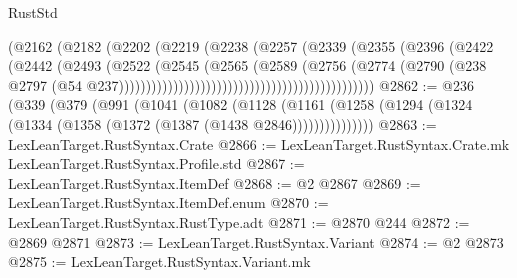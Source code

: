 \begin{lexlean}{RustStd}
\begin{coremodule}
{{{{{{{{{{{{{{{{{{{                                                        (@2162
                                                          (@2182
                                                            (@2202
                                                              (@2219
                                                                (@2238
                                                                  (@2257
                                                                    (@2339
                                                                      (@2355
                                                                        (@2396
                                                                          (@2422
                                                                            (@2442
                                                                              (@2493
                                                                                (@2522
                                                                                  (@2545
                                                                                    (@2565
                                                                                      (@2589
                                                                                        (@2756
                                                                                          (@2774
                                                                                            (@2790
                                                                                              (@238
                                                                                                @2797
                                                                                                (@54
                                                                                                  @237)))))))))))))))))))))))))))))))))))))))))))))))
@2862 := @236
    (@339
      (@379
        (@991
          (@1041
            (@1082
              (@1128
                (@1161 (@1258 (@1294 (@1324 (@1334 (@1358 (@1372 (@1387 (@1438 @2846)))))))))))))))
@2863 := LexLeanTarget.RustSyntax.Crate
@2866 := LexLeanTarget.RustSyntax.Crate.mk LexLeanTarget.RustSyntax.Profile.std
@2867 := LexLeanTarget.RustSyntax.ItemDef
@2868 := @2 @2867
@2869 := LexLeanTarget.RustSyntax.ItemDef.enum
@2870 := LexLeanTarget.RustSyntax.RustType.adt
@2871 := @2870 @244
@2872 := @2869 @2871
@2873 := LexLeanTarget.RustSyntax.Variant
@2874 := @2 @2873
@2875 := LexLeanTarget.RustSyntax.Variant.mk
}}}}}}}}}}}}}}}}}}}
\end{coremodule}
\end{lexlean}
